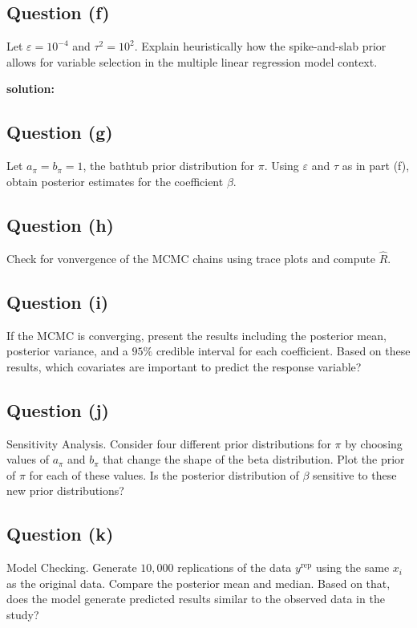 \documentclass[
]{article}
\begin{document}
\hypertarget{question-f}{%
\subsection{Question (f)}\label{question-f}}

Let \(\varepsilon = 10^{-4}\) and \(\tau^2 = 10^2\). Explain
heuristically how the spike-and-slab prior allows for variable selection
in the multiple linear regression model context.

\textbf{solution:}

\hypertarget{question-g}{%
\subsection{Question (g)}\label{question-g}}

Let \(a_{\pi} = b_{\pi} = 1\), the bathtub prior distribution for
\(\pi\). Using \(\varepsilon\) and \(\tau\) as in part (f), obtain
posterior estimates for the coefficient \(\beta\).

\hypertarget{question-h}{%
\subsection{Question (h)}\label{question-h}}

Check for vonvergence of the MCMC chains using trace plots and compute
\(\hat{R}\).

\hypertarget{question-i}{%
\subsection{Question (i)}\label{question-i}}

If the MCMC is converging, present the results including the posterior
mean, posterior variance, and a \(95\%\) credible interval for each
coefficient. Based on these results, which covariates are important to
predict the response variable?

\hypertarget{question-j}{%
\subsection{Question (j)}\label{question-j}}

Sensitivity Analysis. Consider four different prior distributions for
\(\pi\) by choosing values of \(a_\pi\) and \(b_\pi\) that change the
shape of the beta distribution. Plot the prior of \(\pi\) for each of
these values. Is the posterior distribution of \(\beta\) sensitive to
these new prior distributions?

\hypertarget{question-k}{%
\subsection{Question (k)}\label{question-k}}

Model Checking. Generate \(10,000\) replications of the data
\(y^{\text{rep}}\) using the same \(x_i\) as the original data. Compare
the posterior mean and median. Based on that, does the model generate
predicted results similar to the observed data in the study?
\end{document}
